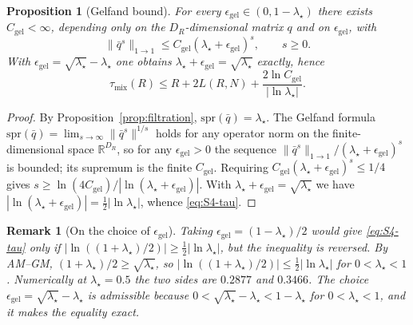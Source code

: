 \documentclass[twoside,11pt]{article}
\newtheorem{sprop}[slemma]{Proposition}
\newtheorem{srem}[slemma]{Remark}
\begin{document}
\begin{sprop}[Gelfand bound]\label{prop:gelfand}
For every $\epsilon_{\mathrm{gel}}\in(0,1-\lambda_\star)$ there exists $C_{\mathrm{gel}}<\infty$,
depending only on the $D_R$-dimensional matrix $q$ and on $\epsilon_{\mathrm{gel}}$,
with
\begin{equation}\label{eq:S4-gelfand}
\|\bar q^{s}\|_{1\to1}\le C_{\mathrm{gel}}(\lambda_\star+\epsilon_{\mathrm{gel}})^{s},
\qquad s\ge0.
\end{equation}
With $\epsilon_{\mathrm{gel}}=\sqrt{\lambda_\star}-\lambda_\star$ one obtains
$\lambda_\star+\epsilon_{\mathrm{gel}}=\sqrt{\lambda_\star}$ exactly, hence
\begin{equation}\label{eq:S4-tau}
\tau_{\mathrm{mix}}(R)\le R+2L(R,N)+\frac{2\ln C_{\mathrm{gel}}}{|\ln\lambda_\star|}.
\end{equation}
\end{sprop}

\begin{proof}
By Proposition~\ref{prop:filtration}, $\mathrm{spr}(\bar q)=\lambda_\star$. The Gelfand
formula $\mathrm{spr}(\bar q)=\lim_{s\to\infty}\|\bar q^{s}\|^{1/s}$ holds for any
operator norm on the finite-dimensional space $\mathbb R^{D_R}$, so for any
$\epsilon_{\mathrm{gel}}>0$ the sequence
$\|\bar q^{s}\|_{1\to1}/(\lambda_\star+\epsilon_{\mathrm{gel}})^{s}$ is bounded; its supremum is
the finite $C_{\mathrm{gel}}$. Requiring $C_{\mathrm{gel}}(\lambda_\star+\epsilon_{\mathrm{gel}})^{s}
\le1/4$ gives
$s\ge\ln(4C_{\mathrm{gel}})/|\ln(\lambda_\star+\epsilon_{\mathrm{gel}})|$. With
$\lambda_\star+\epsilon_{\mathrm{gel}}=\sqrt{\lambda_\star}$ we have
$|\ln(\lambda_\star+\epsilon_{\mathrm{gel}})|=\tfrac12|\ln\lambda_\star|$, whence \eqref{eq:S4-tau}.
\end{proof}

\begin{srem}[On the choice of $\epsilon_{\mathrm{gel}}$]\label{rem:S4-eps}\upshape
Taking $\epsilon_{\mathrm{gel}}=(1-\lambda_\star)/2$ would give \eqref{eq:S4-tau} only if
$|\ln((1+\lambda_\star)/2)|\ge\tfrac12|\ln\lambda_\star|$, but the inequality is reversed.
By AM--GM,
$(1+\lambda_\star)/2\ge\sqrt{\lambda_\star}$, so
$|\ln((1+\lambda_\star)/2)|\le\tfrac12|\ln\lambda_\star|$ for $0<\lambda_\star<1$. Numerically at
$\lambda_\star=0.5$ the two sides are $0.2877$ and $0.3466$. The choice
$\epsilon_{\mathrm{gel}}=\sqrt{\lambda_\star}-\lambda_\star$ is admissible because
$0<\sqrt{\lambda_\star}-\lambda_\star<1-\lambda_\star$ for $0<\lambda_\star<1$, and it makes the equality exact.
\end{srem}
\end{document}
